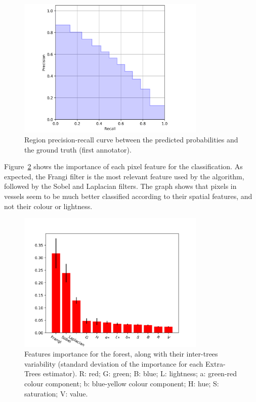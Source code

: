 \begin{figure}
  \centering
  \includegraphics[width=0.8\textwidth]{figures/precision-recall}
  \caption{Region precision-recall curve between the predicted probabilities and the ground truth (first annotator).}
  \label{fig:pr}
\end{figure}

Figure~\ref{fig:importance} shows the importance of each pixel feature for the classification. As expected, the Frangi filter is the most relevant feature used by the algorithm, followed by the Sobel and Laplacian filters. The graph shows that pixels in vessels seem to be much better classified according to their spatial features, and not their colour or lightness.

\begin{figure}
  \centering
  \includegraphics[width=0.8\textwidth]{figures/importances}
  \caption{Features importance for the forest, along with their inter-trees variability (standard deviation of the importance for each Extra-Trees estimator). R: red; G: green; B: blue; L: lightness; a: green-red colour component; b: blue-yellow colour component; H: hue; S: saturation; V: value.}
  \label{fig:importance}
\end{figure}
